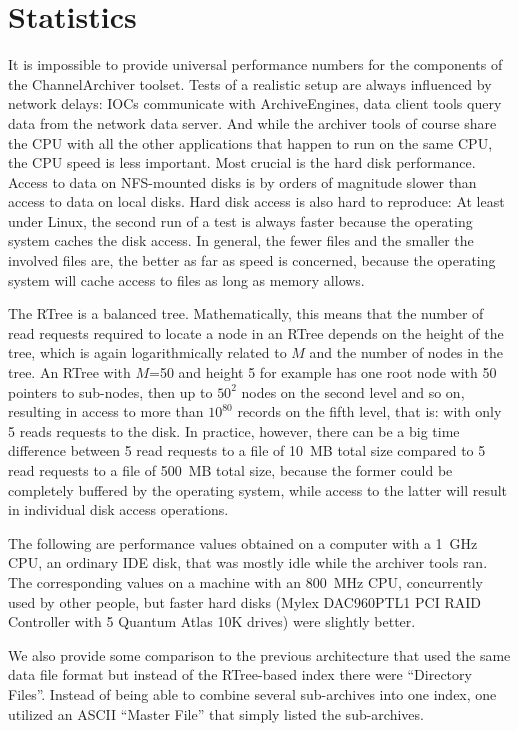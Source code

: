 \section{Statistics} \label{sec:perfstats}
It is impossible to provide universal performance numbers for the
components of the ChannelArchiver toolset. Tests of a realistic setup
are always influenced by network delays: IOCs communicate with ArchiveEngines,
data client tools query data from the network data server.
And while the archiver tools of course share the CPU with all the
other applications that happen to run on the same CPU,
the CPU speed is less important. Most crucial is the hard
disk performance. Access to data on NFS-mounted disks is by orders of
magnitude slower than access to data on local disks.
Hard disk access is also hard to reproduce: At least under Linux, the second
run of a test is always faster because the operating system caches the
disk access. In general, the fewer files and the smaller the involved
files are, the better as far as speed is concerned, because the
operating system will cache access to files as long as memory allows.

The RTree is a balanced tree. Mathematically, this means that the
number of read requests required to locate a node in an RTree depends
on the height of the tree, which is again logarithmically related to
$M$ and the number of nodes in the tree.  An RTree with $M$=50 and
height 5 for example has one root node with 50 pointers to sub-nodes,
then up to $50^2$ nodes on the second level and so on, resulting in
access to more than $10^{80}$ records on the fifth level, that is:
with only 5 reads requests to the disk.
In practice, however, there can be a big time difference between 5
read requests to a file of 10~MB total size compared to 5 read
requests to a file of 500~MB total size, because the former could be
completely buffered by the operating system, while access to the
latter will result in individual disk access operations.

The following are performance values obtained on a computer
with a 1~GHz CPU, an ordinary IDE disk, that was mostly idle
while the archiver tools ran. %
The corresponding values on a machine with an 800~MHz CPU, concurrently
used by other people, but faster hard disks (Mylex
DAC960PTL1 PCI RAID Controller with 5 Quantum Atlas 10K drives) were
slightly better. %

We also provide some comparison to the previous architecture that used
the same data file format but instead of the RTree-based index there
were ``Directory Files''. Instead of being able to combine several sub-archives
into one index, one utilized an ASCII ``Master File'' that simply listed the
sub-archives.

